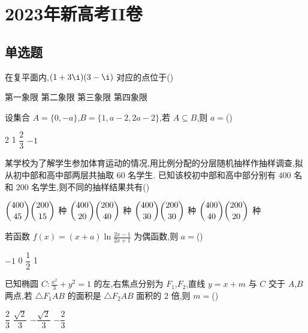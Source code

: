 
\chapter{2023年新高考II卷}

\section{单选题}

\begin{problem}
在复平面内,\((1+3\i)(3-\i)\) 对应的点位于(\quad)

\choices
    {第一象限}
    {第二象限}
    {第三象限}
    {第四象限}
\end{problem}

\begin{problem}
设集合 \(A=\{0,-a\}\),\(B=\{1,a-2,2a-2\}\),若 \(A\subseteq B\),则 \(a=\)(\quad)

\choices
    {2}
    {1}
    {\(\dfrac23\)}
    {\(-1\)}
\end{problem}

\begin{problem}
某学校为了解学生参加体育运动的情况,用比例分配的分层随机抽样作抽样调查,拟从初中部和高中部两层共抽取 \(60\) 名学生. 已知该校初中部和高中部分别有 \(400\) 名和 \(200\) 名学生,则不同的抽样结果共有(\quad)

\choices
    {\(\dbinom{400}{45}\dbinom{200}{15}\) 种}
    {\(\dbinom{400}{20}\dbinom{200}{40}\) 种}
    {\(\dbinom{400}{30}\dbinom{200}{30}\) 种}
    {\(\dbinom{400}{40}\dbinom{200}{20}\) 种}
\end{problem}

\begin{problem}
若函数 \(f(x)=(x+a)\ln\frac{2x-1}{2x+1}\) 为偶函数,则 \(a=\)(\quad)

\choices
    {\(-1\)}
    {0}
    {\(\dfrac12\)}
    {1}
\end{problem}

\begin{problem}
已知椭圆 \(C:\frac{x^2}{3}+y^2=1\) 的左,右焦点分别为 \(F_1\),\(F_2\),直线 \(y=x+m\) 与 \(C\) 交于 \(A\),\(B\) 两点,若 \(\triangle F_1AB\) 的面积是 \(\triangle F_2AB\) 面积的 \(2\) 倍,则 \(m=\)(\quad)

\choices
    {\(\dfrac23\)}
    {\(\dfrac{\sqrt2}{3}\)}
    {\(-\dfrac{\sqrt2}{3}\)}
    {\(-\dfrac23\)}
\end{problem}


